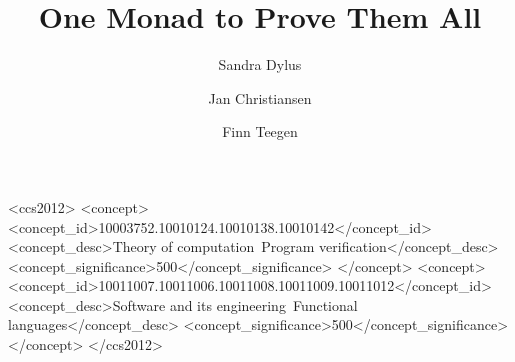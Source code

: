 \documentclass[english,submission]{programming}
\begin{document}
\title{One Monad to Prove Them All}

\author[a]{Sandra Dylus}
\author{Jan Christiansen}
\author[a]{Finn Teegen}





\begin{CCSXML}
<ccs2012>
<concept>
<concept_id>10003752.10010124.10010138.10010142</concept_id>
<concept_desc>Theory of computation~Program verification</concept_desc>
<concept_significance>500</concept_significance>
</concept>
<concept>
<concept_id>10011007.10011006.10011008.10011009.10011012</concept_id>
<concept_desc>Software and its engineering~Functional languages</concept_desc>
<concept_significance>500</concept_significance>
</concept>
</ccs2012>
\end{CCSXML}
\end{document}
